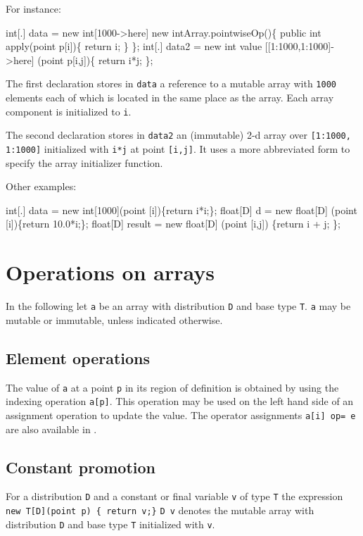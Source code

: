 For instance:
\begin{x10}
int[.] data 
    = new int[1000->here] 
         new intArray.pointwiseOp()\{
             public int apply(point p[i])\{
               return i;
           \}
     \};
int[.] data2 
    = new int value [[1:1000,1:1000]->here] 
        (point p[i,j])\{ return i*j; \};
\end{x10}

{}\noindent 
The first declaration stores in {\tt data} a reference to a mutable
array with {\tt 1000} elements each of which is located in the
same place as the array. Each array component is initialized to {\tt i}.

The second declaration stores in {\tt data2} an (immutable)
2-d array over {\tt [1:1000, 1:1000]} initialized with {\tt i*j}
at point {\tt [i,j]}. It uses a more abbreviated form to specify 
the array initializer function.

Other examples:
\begin{x10}
int[.] data 
   = new int[1000](point [i])\{return i*i;\};
float[D] d 
   = new float[D] (point [i])\{return 10.0*i;\}; 
float[D] result 
   = new float[D] 
     (point [i,j]) \{return i + j; \};
\end{x10}

\section{Operations on arrays}
In the following let {\tt a} be an array with distribution {\tt D} and
base type {\tt T}. {\tt a} may be mutable or immutable, unless
indicated otherwise.

\subsection{Element operations}
The value of {\tt a} at a point {\tt p} in its region of definition is
obtained by using the indexing operation {\tt a[p]}. This operation
may be used on the left hand side of an assignment operation to update
the value. The operator assignments {\tt a[i] op= e} are also available
in \Xten{}.

\subsection{Constant promotion}\label{ConstantArray}

For a distribution {\tt D} and a constant or final variable {\tt v} of
type {\tt T} the expression {\tt new T[D](point p) \{ return v;\}}
{\tt D v} denotes the mutable array with
distribution {\tt D} and base type {\tt T} initialized with {\tt v}.

